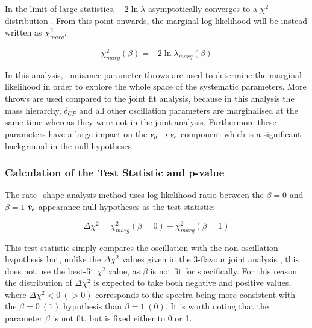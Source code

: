 {In the limit of large statistics, $-2\ln \lambda$ asymptotically converges to a $\chi^2$ distribution \cite{WilksTheorem}. From this point onwards, the marginal log-likelihood will be instead written as $\chi^2_{marg}$.



\begin{equation} \label{eq:marginal_chisq}
\chi^2_{marg} \left( \beta \right) 
= -2 \; \textrm{ln} \; \lambda_{marg}
\left( \beta \right)
\end{equation}

In this analysis, \NToysMarg\ nuisance parameter throws are used to determine the marginal likelihood in order to explore the whole space of the systematic parameters. More throws are used compared to the joint fit analysis, because in this analysis the mass hierarchy, $\delta_{CP}$ and all other oscillation parameters are marginalised at the same time whereas they were not in the joint analysis. Furthermore these parameters have a large impact on the $\nu_{\mu} \rightarrow \nu_{e}$ component which is a significant background in the null hypotheses.



\subsubsection{Calculation of the Test Statistic and p-value}

} %

The rate+shape analysis method uses log-likelihood ratio between the $\beta = 0$ and $\beta = 1$ $\bar{\nu}_{e}$ appearance null hypotheses as the test-statistic:

\begin{equation} \label{eq:Delta_chisq}
\Delta \chi^2 = \chi_{marg}^2 \left( \beta = 0 \right) - \chi_{marg}^2 \left( \beta = 1 \right)
\end{equation}


This test statistic simply compares the oscillation with the non-oscillation hypothesis but, unlike the $\Delta \chi^2$ values given in the 3-flavour joint analysis \cite{OurRun18CC1piJointAnalysis3Flavour}, this does not use the best-fit $\chi^2$ value, as $\beta$ is not fit for specifically. For this reason the distribution of $\Delta \chi^2$ is expected to take both negative and positive values, where $\Delta \chi^2 < 0\ (> 0)$ corresponds to the spectra being more consistent with the $\beta = 0\ (1)$ hypothesis than $\beta = 1\ (0)$. It is worth noting that the parameter $\beta$ is not fit, but is fixed either to 0 or 1. %

